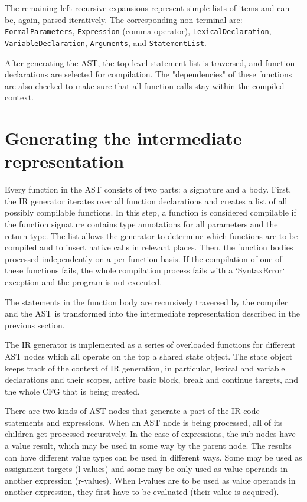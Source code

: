 The remaining left recursive expansions represent simple lists of items and can be, again, parsed iteratively. The corresponding non-terminal are: \texttt{FormalParameters}, \texttt{Expression} (comma operator), \texttt{LexicalDeclaration}, \texttt{VariableDeclaration}, \texttt{Arguments}, and \texttt{StatementList}.

After generating the AST, the top level statement list is traversed, and function declarations are selected for compilation. The "dependencies" of these functions are also checked to make sure that all function calls stay within the compiled context.


\section{Generating the intermediate representation}

Every function in the AST consists of two parts: a signature and a body. First, the IR generator iterates over all function declarations and creates a list of all possibly compilable functions. In this step, a function is considered compilable if the function signature contains type annotations for all parameters and the return type. The list allows the generator to determine which functions are to be compiled and to insert native calls in relevant places. Then, the function bodies processed independently on a per-function basis. If the compilation of one of these functions fails, the whole compilation process fails with a `SyntaxError` exception and the program is not executed.

The statements in the function body are recursively traversed by the compiler and the AST is transformed into the intermediate representation described in the previous section.

The IR generator is implemented as a series of overloaded functions for different AST nodes which all operate on the top a shared state object. The state object keeps track of the context of IR generation, in particular, lexical and variable declarations and their scopes, active basic block, break and continue targets, and the whole CFG that is being created.


There are two kinds of AST nodes that generate a part of the IR code -- statements and expressions. When an AST node is being processed, all of its children get processed recursively. In the case of expressions, the sub-nodes have a value result, which may be used in some way by the parent node. The results can have different value types can be used in different ways. Some may be used as assignment targets (l-values) and some may be only used as value operands in another expression (r-values). When l-values are to be used as value operands in another expression, they first have to be evaluated (their value is acquired).


